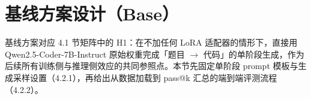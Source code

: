 \section{基线方案设计（Base）}

基线方案对应 4.1 节矩阵中的 H1：在不加任何 LoRA 适配器的情形下，直接用 Qwen2.5-Coder-7B-Instruct 原始权重完成「题目 $\to$ 代码」的单阶段生成，作为后续所有训练侧与推理侧效应的共同参照点。本节先固定单阶段 prompt 模板与生成采样设置（4.2.1），再给出从数据加载到 pass@k 汇总的端到端评测流程（4.2.2）。




